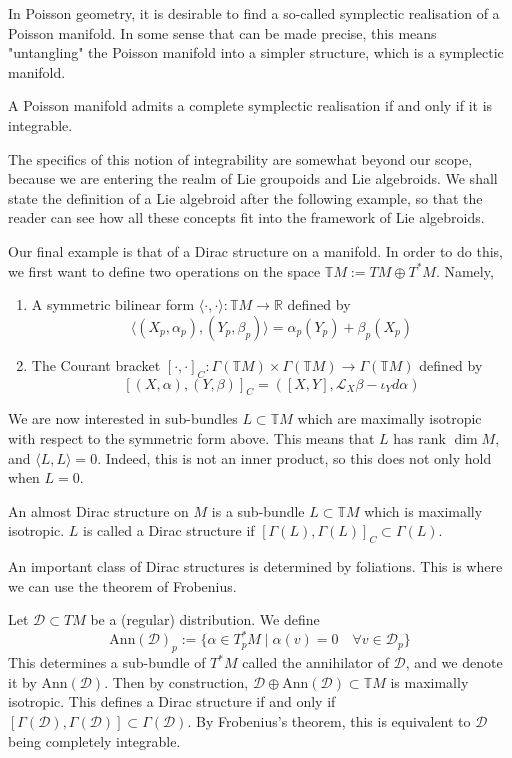 In Poisson geometry, it is desirable to find a so-called symplectic realisation of a Poisson manifold. In some sense that can be made precise, this means "untangling" the Poisson manifold into a simpler structure, which is a symplectic manifold. 
\begin{theorem}
  A Poisson manifold admits a complete symplectic realisation if and only if it is integrable.
\end{theorem}
The specifics of this notion of integrability are somewhat beyond our scope, because we are entering the realm of Lie groupoids and Lie algebroids. We shall state the definition of a Lie algebroid after the following example, so that the reader can see how all these concepts fit into the framework of Lie algebroids.\par
Our final example is that of a Dirac structure on a manifold. In order to do this, we first want to define two operations on the space $\mathbb{T}M:=TM\oplus T^*M$. Namely, 
\begin{enumerate}
  \item A symmetric bilinear form $\langle\cdot,\cdot\rangle:\mathbb{T}M\to\mathbb{R}$ defined by $$\langle(X_p,\alpha_p),(Y_p,\beta_p)\rangle=\alpha_p(Y_p)+\beta_p(X_p)$$
  \item The Courant bracket $[\cdot,\cdot]_C:\Gamma(\mathbb{T}M)\times\Gamma(\mathbb{T}M)\to\Gamma(\mathbb{T}M)$ defined by $$[(X,\alpha),(Y,\beta)]_C=([X,Y],\mathcal{L}_X\beta-\iota_Yd\alpha)$$
\end{enumerate}
We are now interested in sub-bundles $L\subset\mathbb{T}M$ which are maximally isotropic with respect to the symmetric form above. This means that $L$ has rank $\dim M$, and $\langle L,L\rangle=0$. Indeed, this is not an inner product, so this does not only hold when $L=0$.
\begin{definition}
  An almost Dirac structure on $M$ is a sub-bundle $L\subset\mathbb{T}M$ which is maximally isotropic. $L$ is called a Dirac structure if $[\Gamma(L),\Gamma(L)]_C\subset\Gamma(L)$.
\end{definition}
An important class of Dirac structures is determined by foliations. This is where we can use the theorem of Frobenius.
\begin{example}
  Let $\mathcal{D}\subset TM$ be a (regular) distribution. We define $$\text{Ann}(\mathcal{D})_p:=\{\alpha\in T_p^*M\mid \alpha(v)=0\quad\forall v\in \mathcal{D}_p\}$$
  This determines a sub-bundle of $T^*M$ called the annihilator of $\mathcal{D}$, and we denote it by $\text{Ann}(\mathcal{D})$. Then by construction, $\mathcal{D}\oplus\text{Ann}(\mathcal{D})\subset\mathbb{T}M$ is maximally isotropic. This defines a Dirac structure if and only if $[\Gamma(\mathcal{D}),\Gamma(\mathcal{D})]\subset\Gamma(\mathcal{D})$. By Frobenius's theorem, this is equivalent to $\mathcal{D}$ being completely integrable.
\end{example}
